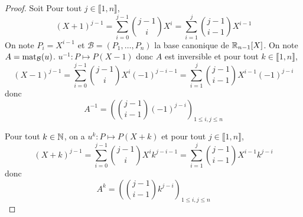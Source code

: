 \documentclass[12pt]{article}
\begin{document}
\begin{proof}
    Soit 
    Pour tout $j\in\llbracket1,n\rrbracket$,
    \begin{equation}
        (X+1)^{j-1}=\sum_{i=0}^{j-1}\binom{j-1}{i}X^{i}=\sum_{i=1}^{j}\binom{j-1}{i-1}X^{i-1}
    \end{equation}
    On note $P_{i}=X^{i-1}$ et $\mathcal{B}=(P_{1},\dots,P_{n})$ la base canonique de $\mathbb{R}_{n-1}[X]$. On note $A=\operatorname{mat}_{\mathcal{B}}(u)$. $u^{-1}\colon P\mapsto P(X-1)$ donc $A$ est inversible et pour tout $k\in\llbracket1,n\rrbracket$,
    \begin{equation}
        (X-1)^{j-1}=\sum_{i=0}^{j-1}\binom{j-1}{i}X^{i}(-1)^{j-i-1}=\sum_{i=1}^{j}\binom{j-1}{i-1}X^{i-1}(-1)^{j-i}
    \end{equation}
    donc 
    \begin{equation}
        \boxed{A^{-1}=\left(\binom{j-1}{i-1}(-1)^{j-i}\right)_{1\leqslant i,j\leqslant n}}
    \end{equation}

    Pour tout $k\in\mathbb{N}$, on a $u^{k}\colon P\mapsto P(X+k)$ et pour tout $j\in\llbracket1,n\rrbracket$,
    \begin{equation}
        (X+k)^{j-1}=\sum_{i=0}^{j-1}\binom{j-1}{i}X^{i}k^{j-i-1}=\sum_{i=1}^{j}\binom{j-1}{i-1}X^{i-1}k^{j-i}
    \end{equation}
    donc 
    \begin{equation}
        \boxed{A^{k}=\left(\binom{j-1}{i-1}k^{j-i}\right)_{1\leqslant i,j\leqslant n}}
    \end{equation}
\end{proof}
\end{document}
